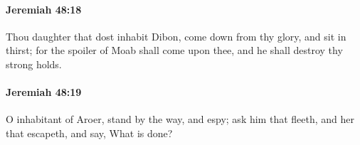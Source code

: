 		\paragraph{Jeremiah 48:18} %
			\label{JEREMIAH-48-18}

			Thou daughter that dost inhabit Dibon, come down from thy glory, and sit in thirst; for the spoiler of Moab shall come upon thee, and he shall destroy thy strong holds.


		\paragraph{Jeremiah 48:19} %
			\label{JEREMIAH-48-19}

			O inhabitant of Aroer, stand by the way, and espy; ask him that fleeth, and her that escapeth, and say, What is done?


